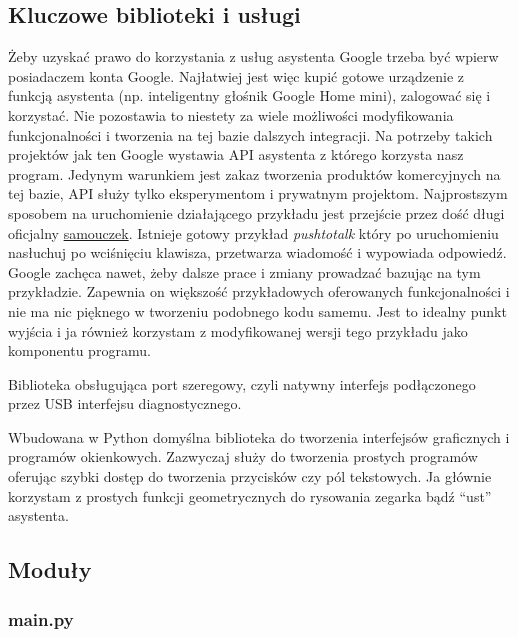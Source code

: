 \documentclass[declaration,shortabstract, inz]{iithesis}
\begin{document}
\subsection{Kluczowe biblioteki i usługi}
\begin{description}[style=nextline]
    \item[Google Assistant Service]
        Żeby uzyskać prawo do korzystania z usług asystenta Google trzeba być wpierw posiadaczem konta Google. Najłatwiej jest więc kupić gotowe urządzenie z funkcją asystenta (np. inteligentny głośnik Google Home mini), zalogować się i korzystać. Nie pozostawia to niestety za wiele możliwości modyfikowania funkcjonalności i tworzenia na tej bazie dalszych integracji. Na potrzeby takich projektów jak ten Google wystawia API asystenta z którego korzysta nasz program. Jedynym warunkiem jest zakaz tworzenia produktów komercyjnych na tej bazie, API służy tylko eksperymentom i prywatnym projektom. Najprostszym sposobem na uruchomienie działającego przykładu jest przejście przez dość długi oficjalny \href{https://developers.google.com/assistant/sdk/guides/service/python}{\color{blue} samouczek}. Istnieje gotowy przykład \textit{pushtotalk} który po uruchomieniu nasłuchuj po wciśnięciu klawisza, przetwarza wiadomość i wypowiada odpowiedź. Google zachęca nawet, żeby dalsze prace i zmiany prowadzać bazując na tym przykładzie. Zapewnia on większość przykładowych oferowanych funkcjonalności i nie ma nic pięknego w tworzeniu podobnego kodu samemu. Jest to idealny punkt wyjścia i ja również korzystam z modyfikowanej wersji tego przykładu jako komponentu programu.
    \item[pyserial]
        Biblioteka obsługująca port szeregowy, czyli natywny interfejs podłączonego przez USB interfejsu diagnostycznego.
    \item[tkinter]
        Wbudowana w Python domyślna biblioteka do tworzenia interfejsów graficznych i programów okienkowych. Zazwyczaj służy do tworzenia prostych programów oferując szybki dostęp do tworzenia przycisków czy pól tekstowych. Ja głównie korzystam z prostych funkcji geometrycznych do rysowania zegarka bądź ``ust'' asystenta.
\end{description}
    

\subsection{Moduły}
\subsubsection{main.py}

\end{document}
